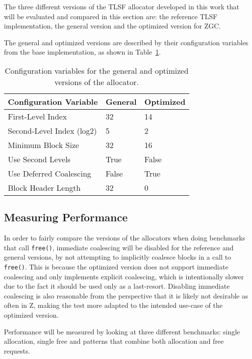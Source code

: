 The three different versions of the TLSF allocator developed in this work that will be evaluated and compared in this section are: the reference TLSF implementation, the general version and the optimized version for ZGC. 

The general and optimized versions are described by their configuration variables from the base implementation, as shown in Table~\ref{table:configuration-variables}.

\begin{table}[H]
    \centering
    \begin{tabular}{lp{2cm}p{6.9cm}}
    \textbf{{Configuration Variable}} & \textbf{{General}} & \textbf{{Optimized}} \\ \hline
    First-Level Index         & 32       & 14     \\ \hline
    Second-Level Index (log2) & 5        & 2      \\ \hline
    Minimum Block Size        & 32       & 16     \\ \hline
    Use Second Levels         & True     & False  \\ \hline
    Use Deferred Coalescing   & False    & True   \\ \hline
    Block Header Length       & 32       & 0        
    \end{tabular}
    \caption{Configuration variables for the general and optimized versions of the allocator.}
    \label{table:configuration-variables}
\end{table}

\subsection{Measuring Performance}

In order to fairly compare the versions of the allocators when doing benchmarks that call \texttt{free()}, immediate coalescing will be disabled for the reference and general versions, by not attempting to implicitly coalesce blocks in a call to \texttt{free()}. This is because the optimized version does not support immediate coalescing and only implements explicit coalescing, which is intentionally slower due to the fact it should be used only as a last-resort. Disabling immediate coalescing is also reasonable from the perspective that it is likely not desirable as often in Z, making the test more adapted to the intended use-case of the optimized version.

Performance will be measured by looking at three different benchmarks: single allocation, single free and patterns that combine both allocation and free requests.


